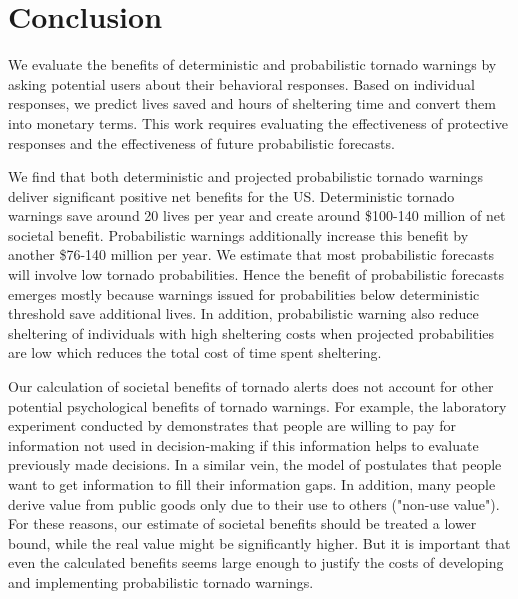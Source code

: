 \documentclass{ametsocV6.1}
\begin{document}
\vspace{30pt}
\section{Conclusion}

We evaluate the benefits of deterministic and probabilistic tornado warnings by asking potential users about their behavioral responses. Based on individual responses, we predict lives saved and hours of sheltering time and convert them into monetary terms. This work requires evaluating the effectiveness of protective responses and the effectiveness of future probabilistic forecasts.

We find that both deterministic and projected probabilistic tornado warnings deliver significant positive net benefits for the US. Deterministic tornado warnings save around 20 lives per year and create around \$100-140 million of net societal benefit. Probabilistic warnings additionally increase this benefit by another \$76-140 million per year. We estimate that most probabilistic forecasts will involve low tornado probabilities. Hence the benefit of probabilistic forecasts emerges mostly because warnings issued for probabilities below deterministic threshold save additional lives. In addition, probabilistic warning also reduce sheltering of individuals with high sheltering costs when projected probabilities are low which reduces the total cost of time spent sheltering.

Our calculation of societal benefits of tornado alerts does not account for other potential psychological benefits of tornado warnings. For example, the laboratory experiment conducted by \citet{eliaz_paying_2010} demonstrates that people are willing to pay for information not used in decision-making if this information helps to evaluate previously made decisions. In a similar vein, the model of \citet{golman_demand_2021} postulates that people want to get information to fill their information gaps. In addition, many people derive value from public goods only due to their use to others ("non-use value"). For these reasons, our estimate of societal benefits should be treated a lower bound, while the real value might be significantly higher. But it is important that even the calculated benefits seems large enough to justify the costs of developing and implementing probabilistic tornado warnings.
\end{document}
